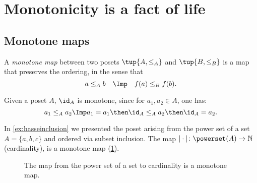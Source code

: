 \section{Monotonicity is a fact of life}
\subsection{Monotone maps}

\begin{definition}
A \emph{monotone map} between two posets
$\tup{A, \leq_A}$ and $\tup{B, \leq_B}$ is a map that preserves the ordering, in the sense that 
\begin{equation}
 a \leq_A b \quad \Imp \quad f(a) \leq_B f(b).
\end{equation}

\begin{comment}\noindent A monotone map is an \emph{isomorphism} if the other direction
of the implication holds as well:
\begin{equation}
 a \leq_A b \quad \Leftrightarrow \quad f(a) \leq_B f(b).
\end{equation}
\end{comment}
\end{definition}
\begin{remark}
Given a poset $A$, $\id_A$ is monotone, since for $a_1,a_2\in A$, one has:
\begin{equation}
a_1\leq_A a_2 \Imp a_1=a_1\then \id_A \leq_A a_2\then \id_A = a_2.
\end{equation}
\end{remark}

\begin{example}
In \cref{ex:hasseinclusion} we presented the poset arising from the power set of a set $A=\{a,b,c\}$ and ordered via subset inclusion. The map $\vert \cdot \vert \colon \powerset(A)\to \mathbb{N}$ (cardinality), is a monotone map (\cref{fig:cardinality}).
\begin{figure}[h!]
\begin{center}
\end{center}
\caption{The map from the power set of a set to cardinality is a monotone map. \label{fig:cardinality}}
\end{figure}
\end{example}

